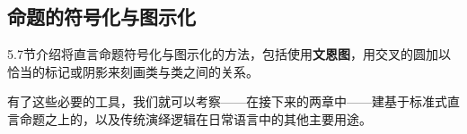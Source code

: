 \subsection{命题的符号化与图示化}
5.7节介绍将直言命题符号化与图示化的方法，包括使用\textbf{文恩图}，用交叉的圆加以恰当的标记或阴影来刻画类与类之间的关系。

\begin{center}
\end{center}

有了这些必要的工具，我们就可以考察——在接下来的两章中——建基于标准式直言命题之上的，以及传统演绎逻辑在日常语言中的其他主要用途。

